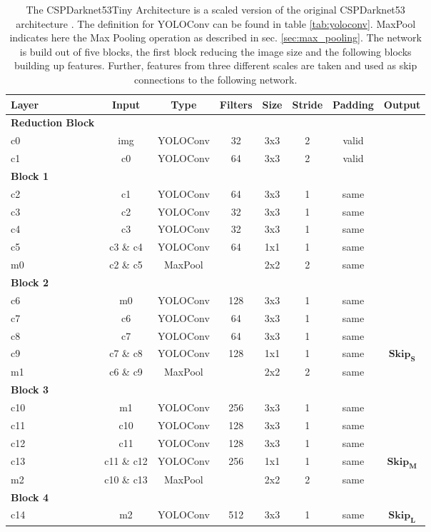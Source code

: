 \begin{table} %
\begin{center}

\begin{tabular}{l|c|c|c|c|c|c|c}
    \textbf{Layer} & \textbf{Input} & \textbf{Type} & \textbf{Filters} & \textbf{Size} & \textbf{Stride} & \textbf{Padding} & \textbf{Output} \\
    \hline
    \textbf{Reduction Block} & & & & & &\\
    c0 & img & YOLOConv & 32 & 3x3 & 2 & valid\\
    c1 & c0 & YOLOConv & 64 & 3x3 & 2 & valid\\
    \textbf{Block 1} & & & & & &\\
    c2 & c1 & YOLOConv & 64 & 3x3 & 1 & same\\
    c3 & c2 & YOLOConv & 32 & 3x3 & 1 & same\\
    c4 & c3 & YOLOConv & 32 & 3x3 & 1 & same\\
    c5 & c3 \& c4 & YOLOConv & 64 & 1x1 & 1 & same\\
    m0 & c2 \& c5 & MaxPool &  & 2x2 & 2 & same\\
    \textbf{Block 2} & & & & & &\\
    c6 & m0 & YOLOConv & 128 & 3x3 & 1 & same\\
    c7 & c6 & YOLOConv & 64 & 3x3 & 1 & same\\
    c8 & c7 & YOLOConv & 64 & 3x3 & 1 & same\\
    c9 & c7 \& c8 & YOLOConv & 128 & 1x1 & 1 & same & $\mathbf{Skip_S}$\\
    m1 & c6 \& c9 & MaxPool & & 2x2  & 2 & same\\
    \textbf{Block 3} & & & & & &\\
    c10 & m1 & YOLOConv & 256 & 3x3 & 1 & same\\
    c11 & c10 & YOLOConv & 128 & 3x3 & 1 & same\\
    c12 & c11 & YOLOConv & 128 & 3x3 & 1 & same\\
    c13 & c11 \& c12 & YOLOConv &  256 & 1x1 & 1 & same & $\mathbf{Skip_M}$\\
    m2 & c10 \& c13 & MaxPool & & 2x2 & 2 & same\\
    \textbf{Block 4} & & & & & &\\
    c14 & m2 & YOLOConv & 512 & 3x3 & 1 & same & $\mathbf{Skip_L}$\\
\end{tabular}

\caption{The CSPDarknet53Tiny Architecture is a scaled version of the original CSPDarknet53 architecture \cite{yolov4}. The definition for YOLOConv can be found in table \ref{tab:yoloconv}. MaxPool indicates here the Max Pooling operation as described in sec. \ref{sec:max_pooling}. The network is build out of five blocks, the first block reducing the image size and the following blocks building up features. Further, features from three different scales are taken and used as skip connections to the following network.}
\label{tab:darknet_tiny_arch}
\end{center}
\end{table}


